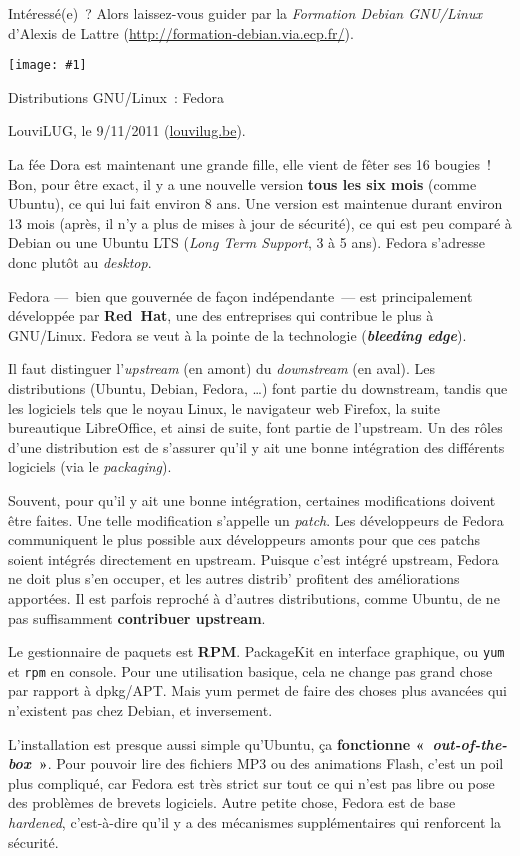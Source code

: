 \documentclass[a5paper,11pt]{article}
\def\titre#1#2{
  \noindent
  \begin{minipage}{0.14\linewidth}
  \texttt{[image: \#1]}
  \end{minipage}
  \begin{minipage}{0.85\linewidth}
    {\LARGE #2}

    \begin{flushright}
      LouviLUG, le 9/11/2011 (\url{louvilug.be}).
    \end{flushright}
  \end{minipage}

  \vspace{0.5cm}
}
\begin{document}
\bigskip Intéressé(e)~? Alors laissez-vous guider par la \textit{Formation
Debian GNU/Linux} d'Alexis de Lattre
(\url{http://formation-debian.via.ecp.fr/}).

\pagebreak \titre{fedora.pdf}{Distributions GNU/Linux~: Fedora}

La fée Dora est maintenant une grande fille, elle vient de fêter ses 16
bougies~! Bon, pour être exact, il y a une nouvelle version \textbf{tous les six
mois} (comme Ubuntu), ce qui lui fait environ 8 ans. Une version est maintenue
durant environ 13 mois (après, il n'y a plus de mises à jour de sécurité), ce
qui est peu comparé à Debian ou une Ubuntu LTS (\textit{Long Term Support}, 3 à
5 ans). Fedora s'adresse donc plutôt au \textit{desktop}.

\bigskip Fedora ---~bien que gouvernée de façon indépendante~--- est
principalement développée par \textbf{Red~Hat}, une des entreprises qui
contribue le plus à GNU/Linux. Fedora se veut à la pointe de la technologie
(\textit{\textbf{bleeding edge}}).

\bigskip Il faut distinguer l'\textit{upstream} (en amont) du
\textit{downstream} (en aval). Les distributions (Ubuntu, Debian, Fedora, …)
font partie du downstream, tandis que les logiciels tels que le noyau Linux, le
navigateur web Firefox, la suite bureautique LibreOffice, et ainsi de suite,
font partie de l'upstream. Un des rôles d'une distribution est de s'assurer
qu'il y ait une bonne intégration des différents logiciels (via le
\textit{packaging}).

Souvent, pour qu'il y ait une bonne intégration, certaines modifications doivent
être faites. Une telle modification s'appelle un \textit{patch}. Les
développeurs de Fedora communiquent le plus possible aux développeurs amonts
pour que ces patchs soient intégrés directement en upstream. Puisque c'est
intégré upstream, Fedora ne doit plus s'en occuper, et les autres distrib'
profitent des améliorations apportées. Il est parfois reproché à d'autres
distributions, comme Ubuntu, de ne pas suffisamment \textbf{contribuer
upstream}.

\bigskip Le gestionnaire de paquets est \textbf{RPM}. PackageKit en interface
graphique, ou \texttt{yum} et \texttt{rpm} en console. Pour une utilisation
basique, cela ne change pas grand chose par rapport à dpkg/APT. Mais yum permet
de faire des choses plus avancées qui n'existent pas chez Debian, et
inversement.

\bigskip L'installation est presque aussi simple qu'Ubuntu, ça
\textbf{fonctionne «~\textit{out-of-the-box}~»}. Pour pouvoir lire des fichiers
MP3 ou des animations Flash, c'est un poil plus compliqué, car Fedora est très
strict sur tout ce qui n'est pas libre ou pose des problèmes de brevets
logiciels. Autre petite chose, Fedora est de base \textit{hardened},
c'est-à-dire qu'il y a des mécanismes supplémentaires qui renforcent la
sécurité.
\end{document}
